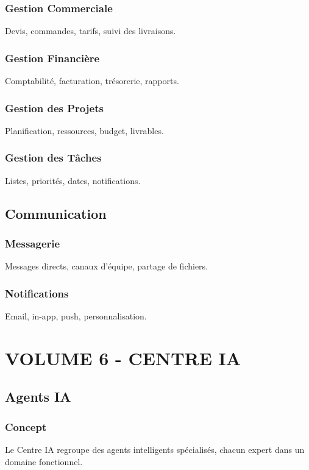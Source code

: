 \documentclass[12pt,a4paper,oneside]{book}
\begin{document}
\section{Gestion Commerciale}
Devis, commandes, tarifs, suivi des livraisons.

\section{Gestion Financière}
Comptabilité, facturation, trésorerie, rapports.

\section{Gestion des Projets}
Planification, ressources, budget, livrables.

\section{Gestion des Tâches}
Listes, priorités, dates, notifications.

\chapter{Communication}

\section{Messagerie}
Messages directs, canaux d'équipe, partage de fichiers.

\section{Notifications}
Email, in-app, push, personnalisation.

\part{VOLUME 6 - CENTRE IA}

\chapter{Agents IA}

\section{Concept}
Le Centre IA regroupe des agents intelligents spécialisés, chacun expert dans un domaine fonctionnel.
\end{document}

